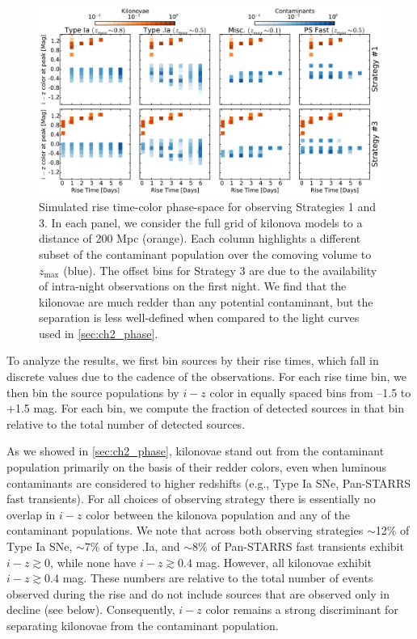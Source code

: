 \begin{figure}[t!]
\centering
\includegraphics[width=\textwidth]{./figs/chapter2/f8.pdf}
\caption{\singlespace Simulated rise time-color phase-space for observing Strategies 1 and 3. In each panel, we consider the full grid of kilonova models to a distance of 200 Mpc (orange). Each column highlights a different subset of the contaminant population over the comoving volume to $z_{\text{max}}$ (blue). The offset bins for Strategy 3 are due to the availability of intra-night observations on the first night. We find that the kilonovae are much redder than any potential contaminant, but the separation is less well-defined when compared to the light curves used in \cref{sec:ch2_phase}.}
\label{fig:ch2_mcphasecol}
\end{figure}

To analyze the results, we first bin sources by their rise times, which fall in discrete values due to the cadence of the observations. For each rise time bin, we then bin the source populations by $i-z$ color in equally spaced bins from --1.5 to +1.5 mag. For each bin, we compute the fraction of detected sources in that bin relative to the total number of detected sources.

As we showed in \cref{sec:ch2_phase}, kilonovae stand out from the contaminant population primarily on the basis of their redder colors, even when luminous contaminants are considered to higher redshifts (e.g., Type Ia SNe, Pan-STARRS fast transients). For all choices of observing strategy there is essentially no overlap in $i-z$ color between the kilonova population and any of the contaminant populations. We note that across both observing strategies $\sim$12\% of Type Ia SNe, $\sim7\%$ of type .Ia, and $\sim8\%$ of Pan-STARRS fast transients exhibit $i-z\gtrsim 0$, while none have $i-z\gtrsim0.4$ mag. However, all kilonovae exhibit $i-z\gtrsim0.4$ mag. These numbers are relative to the total number of events observed during the rise and do not include sources that are observed only in decline (see below). Consequently, $i-z$ color remains a strong discriminant for separating kilonovae from the contaminant population. 

